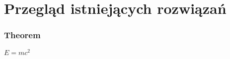 \section{Przegląd istniejących rozwiązań}

\begin{frame}
    \frametitle{Theorem}
    \begin{theorem}
    $E = mc^2$
    \end{theorem}
\end{frame}